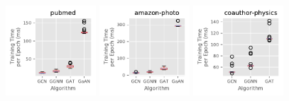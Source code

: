 \begin{figure}[htb]
    \centering
    \includegraphics[width=0.3\textwidth]{figs/experiments/exp_absolute_training_time_comparison_pubmed.pdf}
    \includegraphics[width=0.3\textwidth]{figs/experiments/exp_absolute_training_time_comparison_amazon-photo.pdf}
    \includegraphics[width=0.3\textwidth]{figs/experiments/exp_absolute_training_time_comparison_coauthor-physics.pdf}


\end{figure}
